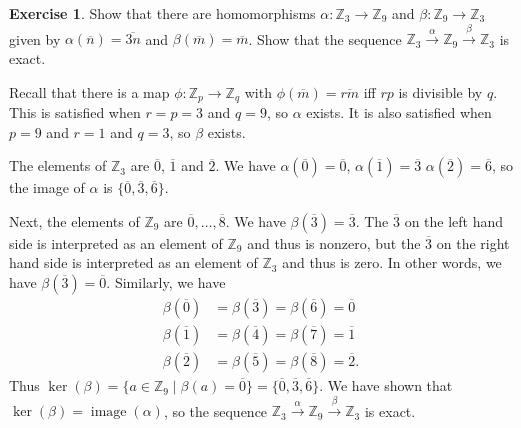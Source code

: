 \documentclass{amsart}
\newcommand{\img}       {\operatorname{image}}
\newcommand{\Z}         {{\mathbb{Z}}}
\newcommand{\al}        {\alpha}
\newcommand{\bt}        {\beta}
\newcommand{\ov}[1]     {\overline{#1}}
\newcommand{\xra}       {\xrightarrow}
\newcommand{\st}        {\;|\;}
\newcommand{\ip}[1]     {\langle #1\rangle}
\renewcommand{\:}{\colon}
\theoremstyle{definition}
\newtheorem{exercise}{Exercise}[section]
\renewenvironment{solution}{\SolutionAtEnd}{\endSolutionAtEnd}
\begin{document}
\begin{exercise}
 Show that there are homomorphisms $\al\:\Z_3\xra{}\Z_9$ and
 $\bt\:\Z_9\xra{}\Z_3$ given by $\al(\ov{n})=\ov{3n}$ and
 $\bt(\ov{m})=\ov{m}$.  Show that the sequence
 $\Z_3\xra{\al}\Z_9\xra{\bt}\Z_3$ is exact.
\end{exercise}
\begin{solution}
 Recall that there is a map $\phi\:\Z_p\xra{}\Z_q$ with
 $\phi(\ov{m})=\ov{rm}$ iff $rp$ is divisible by $q$.  This is
 satisfied when $r=p=3$ and $q=9$, so $\al$ exists.  It is also
 satisfied when $p=9$ and $r=1$ and $q=3$, so $\bt$ exists.

 The elements of $\Z_3$ are $\ov{0}$, $\ov{1}$ and $\ov{2}$.  We have
 $\al(\ov{0})=\ov{0}$, $\al(\ov{1})=\ov{3}$ $\al(\ov{2})=\ov{6}$, so
 the image of $\al$ is $\{\ov{0},\ov{3},\ov{6}\}$.  

 Next, the elements of $\Z_9$ are $\ov{0},\ldots,\ov{8}$.  We have
 $\bt(\ov{3})=\ov{3}$.  The $\ov{3}$ on the left hand side is
 interpreted as an element of $\Z_9$ and thus is nonzero, but the
 $\ov{3}$ on the right hand side is interpreted as an element of
 $\Z_3$ and thus is zero.  In other words, we have
 $\bt(\ov{3})=\ov{0}$.  Similarly, we have
 \begin{align*}
  \bt(\ov{0}) &= \bt(\ov{3}) = \bt(\ov{6}) = \ov{0} \\
  \bt(\ov{1}) &= \bt(\ov{4}) = \bt(\ov{7}) = \ov{1} \\
  \bt(\ov{2}) &= \bt(\ov{5}) = \bt(\ov{8}) = \ov{2}.
 \end{align*}
 Thus
 $\ker(\bt)=\{a\in\Z_9\st\bt(a)=\ov{0}\}=\{\ov{0},\ov{3},\ov{6}\}$.
 We have shown that $\ker(\bt)=\img(\al)$, so the sequence
 $\Z_3\xra{\al}\Z_9\xra{\bt}\Z_3$ is exact.
\end{solution}
\end{document}

